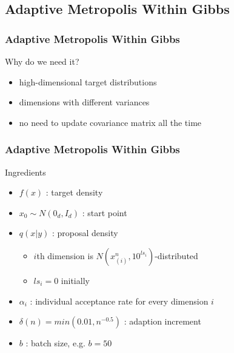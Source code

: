 
\subsection{Adaptive Metropolis Within Gibbs}
\begin{frame}
\frametitle{Adaptive Metropolis Within Gibbs}
\begin{block}{Why do we need it?}
\begin{itemize}
\item high-dimensional target distributions
\item dimensions with different variances
\item no need to update covariance matrix all the time
\end{itemize}
\end{block}

\end{frame}


\begin{frame}
\frametitle{Adaptive Metropolis Within Gibbs}

\begin{block}{Ingredients}
\begin{itemize}
\item $f(x)$ : target density
\item $x_0 \sim N(0_d, I_d)$ : start point
\item $q(x|y)$ : proposal density
\begin{itemize}
  \item $i$th dimension is $ N(x_{(i)}^n, 10^{ls_i})$-distributed
  \item $ls_i = 0$ initially
\end{itemize}
 \item $\alpha_i$ : individual acceptance rate for every dimension $i$
\item $\delta(n) = min(0.01, n^{-0.5})$ : adaption increment
\item $b$ : batch size, e.g. $b=50$
\end{itemize}
\end{block}

\end{frame}




